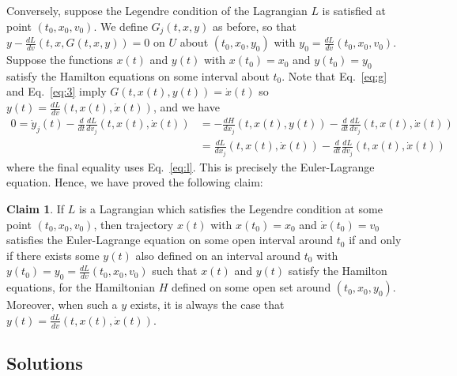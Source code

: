 \documentclass[aps,pra,showpacs,notitlepage,onecolumn,superscriptaddress,nofootinbib]{revtex4-1}
\theoremstyle{definition}
\newtheorem{claim}{Claim}[section]
\begin{document}
Conversely, suppose the Legendre condition of the Lagrangian $L$ is satisfied at point $(t_0, x_0, v_0)$. We define $G_j(t, x, y)$
as before, so that $y - \frac{dL}{dv}(t, x, G(t, x, y)) = 0$ on $U$ about $(t_0, x_0, y_0)$ with $y_0 = \frac{dL}{dv}(t_0, x_0, v_0)$.
Suppose the functions $x(t)$ and $y(t)$ with $x(t_0) = x_0$ and $y(t_0) = y_0$
satisfy the Hamilton equations on some interval about $t_0$. Note that Eq.~\eqref{eq:g} and Eq.~\eqref{eq:3} imply $G(t, x(t), y(t)) = \dot{x}(t)$ so $y(t) = \frac{dL}{dv}(t, x(t), \dot{x}(t))$, and we have
\begin{align}
  0 = \dot{y}_j(t) - \frac{d}{dt} \frac{dL}{dv_j}(t, x(t), \dot{x}(t)) &= -\frac{dH}{dx_j}(t, x(t), y(t)) - \frac{d}{dt} \frac{dL}{dv_j}(t, x(t), \dot{x}(t))
  \\ &= \frac{dL}{dx_j}(t, x(t), \dot{x}(t)) - \frac{d}{dt} \frac{dL}{dv_j}(t, x(t), \dot{x}(t))
  \end{align}
where the final equality uses Eq.~\eqref{eq:l}. This is precisely the Euler-Lagrange equation. Hence, we have proved the following claim:

\begin{claim}
  If $L$ is a Lagrangian which satisfies the Legendre condition at some point $(t_0, x_0, v_0)$, then trajectory $x(t)$ with $x(t_0) = x_0$ and $\dot{x}(t_0) = v_0$ satisfies the Euler-Lagrange
  equation on some open interval around $t_0$ if and only if there exists some $y(t)$ also defined on an interval around $t_0$ with $y(t_0) = y_0 = \frac{dL}{dv}(t_0, x_0, v_0)$ such that $x(t)$
  and $y(t)$ satisfy the Hamilton equations, for the Hamiltonian $H$ defined on some open set around $(t_0, x_0, y_0)$. Moreover, when such a $y$ exists, it is always the case that $y(t) = \frac{dL}{dv}(t, x(t), \dot{x}(t))$.
  \end{claim}

\subsection{Solutions}
\end{document}

